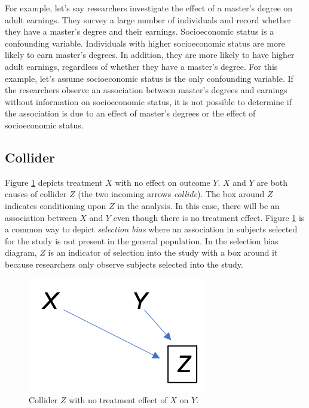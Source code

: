 \documentclass[]{book}
\begin{document}
For example, let's say researchers investigate the effect of a master's degree on adult earnings. They survey a large number of individuals and record whether they have a master's degree and their earnings. Socioeconomic status is a confounding variable. Individuals with higher socioeconomic status are more likely to earn master's degrees. In addition, they are more likely to have higher adult earnings, regardless of whether they have a master's degree. For this example, let's assume socioeconomic status is the only confounding variable. If the researchers observe an association between master's degrees and earnings without information on socioeconomic status, it is not possible to determine if the association is due to an effect of master's degrees or the effect of socioeconomic status.

\hypertarget{collider}{%
\subsection{Collider}\label{collider}}

Figure \ref{fig:collider} depicts treatment \(X\) with no effect on outcome \(Y\). \(X\) and \(Y\) are both causes of collider \(Z\) (the two incoming arrows \emph{collide}). The box around \(Z\) indicates conditioning upon \(Z\) in the analysis. In this case, there will be an association between \(X\) and \(Y\) even though there is no treatment effect. Figure \ref{fig:collider} is a common way to depict \emph{selection bias} where an association in subjects selected for the study is not present in the general population. In the selection bias diagram, \(Z\) is an indicator of selection into the study with a box around it because researchers only observe subjects selected into the study.

\begin{figure}
\centering
\includegraphics{./images/collider.png}
\caption{\label{fig:collider} Collider \(Z\) with no treatment effect of \(X\) on \(Y\).}
\end{figure}
\end{document}
